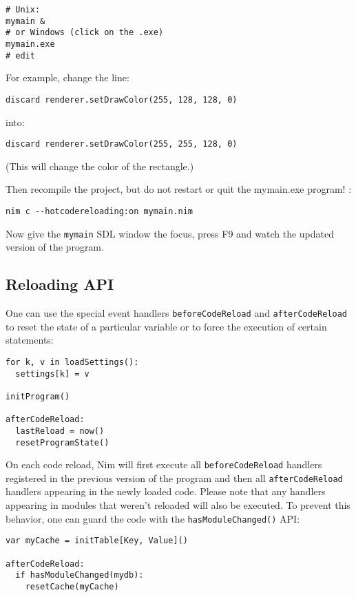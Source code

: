\begin{verbatim}
# Unix:
mymain &
# or Windows (click on the .exe)
mymain.exe
# edit
\end{verbatim}

For example, change the line:

\begin{verbatim}
discard renderer.setDrawColor(255, 128, 128, 0)
\end{verbatim}

into:

\begin{verbatim}
discard renderer.setDrawColor(255, 255, 128, 0)
\end{verbatim}

(This will change the color of the rectangle.)

Then recompile the project, but do not restart or quit the mymain.exe
program! :

\begin{verbatim}
nim c --hotcodereloading:on mymain.nim
\end{verbatim}

Now give the \texttt{mymain} SDL window the focus, press F9 and watch
the updated version of the program.

\hypertarget{reloading-api}{%
\subsection{Reloading API}\label{reloading-api}}

One can use the special event handlers \texttt{beforeCodeReload} and
\texttt{afterCodeReload} to reset the state of a particular variable or
to force the execution of certain statements:

\begin{verbatim}
for k, v in loadSettings():
  settings[k] = v

initProgram()

afterCodeReload:
  lastReload = now()
  resetProgramState()
\end{verbatim}

On each code reload, Nim will first execute all
\texttt{beforeCodeReload} handlers registered in the previous version of
the program and then all \texttt{afterCodeReload} handlers appearing in
the newly loaded code. Please note that any handlers appearing in
modules that weren't reloaded will also be executed. To prevent this
behavior, one can guard the code with the \texttt{hasModuleChanged()}
API:

\begin{verbatim}
var myCache = initTable[Key, Value]()

afterCodeReload:
  if hasModuleChanged(mydb):
    resetCache(myCache)
\end{verbatim}

